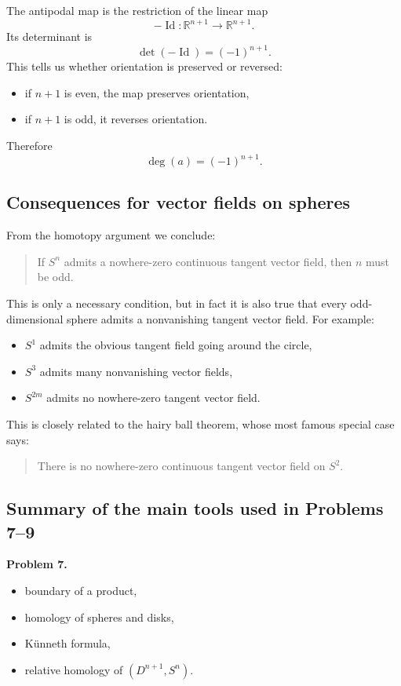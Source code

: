 \documentclass[12pt,a4paper]{article}
\theoremstyle{notespace}
\begin{document}
The antipodal map is the restriction of the linear map
\[
-\operatorname{Id}:\mathbb R^{n+1}\to \mathbb R^{n+1}.
\]
Its determinant is
\[
\det(-\operatorname{Id})=(-1)^{n+1}.
\]
This tells us whether orientation is preserved or reversed:
\begin{itemize}
	\item if \(n+1\) is even, the map preserves orientation,
	\item if \(n+1\) is odd, it reverses orientation.
\end{itemize}
Therefore
\[
\deg(a)=(-1)^{n+1}.
\]

\subsection{Consequences for vector fields on spheres}

From the homotopy argument we conclude:

\begin{quote}
	If \(S^n\) admits a nowhere-zero continuous tangent vector field, then \(n\) must be odd.
\end{quote}

This is only a necessary condition, but in fact it is also true that every odd-dimensional sphere admits a nonvanishing tangent vector field. For example:
\begin{itemize}
	\item \(S^1\) admits the obvious tangent field going around the circle,
	\item \(S^3\) admits many nonvanishing vector fields,
	\item \(S^{2m}\) admits no nowhere-zero tangent vector field.
\end{itemize}

This is closely related to the hairy ball theorem, whose most famous special case says:

\begin{quote}
	There is no nowhere-zero continuous tangent vector field on \(S^2\).
\end{quote}

\subsection{Summary of the main tools used in Problems 7--9}

\textbf{Problem 7.}
\begin{itemize}
	\item boundary of a product,
	\item homology of spheres and disks,
	\item K\"unneth formula,
	\item relative homology of \((D^{n+1},S^n)\).
\end{itemize}
\end{document}
